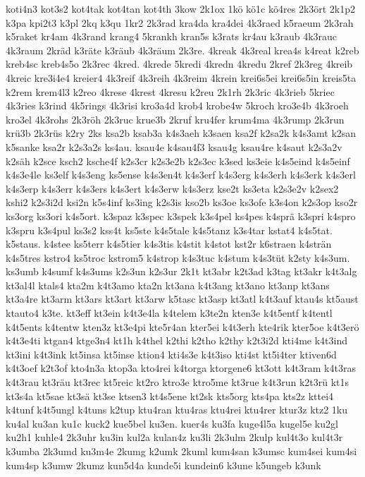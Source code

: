 {koti4n3
kot3s2
kot4tak
kot4tan
kot4th
3kow
2k1ox
1kö
kö1c
kö4res
2k3ört
2k1p2
k3pa
kpi2t3
k3pl
2kq
k3qu
1kr2
2k3rad
kra4da
kra4dei
4k3raed
k5raeum
2k3rah
k5raket
kr4am
4k3rand
krang4
5krankh
kran5s
k3rats
kr4au
k3raub
4k3rauc
4k3raum
2kräd
k3räte
k3räub
4k3räum
2k3re.
4kreak
4k3real
krea4s
k4reat
k2reb
kreb4sc
kreb4s5o
2k3rec
4kred.
4krede
5kredi
4kredn
4kredu
2kref
2k3reg
4kreib
4kreic
kre3i4e4
kreier4
4k3reif
4k3reih
4k3reim
4krein
krei6s5ei
krei6s5in
kreis5ta
k2rem
krem4l3
k2reo
4krese
4krest
4kresu
k2reu
2k1rh
2k3ric
4k3rieb
5kriec
4k3ries
k3rind
4k5rings
4k3risi
kro3a4d
krob4
krobe4w
5kroch
kro3e4b
4k3roeh
kro3el
4k3rohs
2k3röh
2k3ruc
krue3b
2kruf
kru4fer
krum4ma
4k3rump
2k3run
krü3b
2k3rüs
k2ry
2ks
ksa2b
ksab3a
k4s3aeh
k3saen
ksa2f
k2sa2k
k4s3amt
k2san
k5sanke
ksa2r
k2s3a2s
ks4au.
ksau4e
k4sau4f3
ksau4g
ksau4re
k4saut
k2s3a2v
k2säh
k2sce
ksch2
ksche4f
k2s3cr
k2s3e2b
k2s3ec
k3sed
ks3eie
k4s5eind
k4s5einf
k4s3e4le
ks3elf
k4s3eng
ks5ense
k4s3en4t
k4s3erf
k4s3erg
k4s3erh
k4s3erk
k4s3erl
k4s3erp
k4s3err
k4s3ers
k4s3ert
k4s3erw
k4s3erz
kse2t
ks3eta
k2s3e2v
k2sex2
kshi2
k2s3i2d
ksi2n
k5s4inf
ks3ing
k2s3is
kso2b
ks3oe
ks3ofe
k3s4on
k2s3op
kso2r
ks3org
ks3ori
k4s5ort.
k3spaz
k3spec
k3spek
k3s4pel
ks4pes
k4sprä
k3spri
k4spro
k3spru
k3s4pul
ks3s2
kss4t
ks5ste
k4s5tale
k4s5tanz
k3s4tar
kstat4
k4s5tat.
k5staus.
k4stee
ks5terr
k4s5tier
k4s3tis
k4stit
k4stot
kst2r
k6straen
k4strän
k4s5tres
kstro4
ks5troc
kstrom5
k4strop
k4s3tuc
k4stum
k4s3tüt
k2sty
k4s3um.
ks3umb
k4sumf
k4s3ums
k2s3un
k2s3ur
2k1t
kt3abr
k2t3ad
k3tag
kt3akr
k4t3alg
kt3al4l
ktals4
kta2m
k4t3amo
kta2n
kt3ana
k4t3ang
kt3ano
kt3anp
kt3ans
kt3a4re
kt3arm
kt3ars
kt3art
kt3arw
k5tasc
kt3asp
kt3atl
k4t3auf
ktau4s
kt5aust
ktauto4
k3te.
kt3eff
kt3ein
k4t3e4la
k4telem
k3te2n
kten3e
k4t5entf
k4tentl
k4t5ents
k4tentw
kten3z
kt3e4pi
kte5r4an
kter5ei
k4t3erh
kte4rik
kter5oe
k4t3erö
k4t3e4ti
ktgan4
ktge3n4
kt1h
k4thel
k2thi
k2tho
k2thy
k2t3i2d
kti4me
k4t3ind
kt3ini
k4t3ink
kt5insa
kt5inse
ktion4
kti4s3e
k4t3iso
kti4st
kt5i4ter
ktiven6d
k4t3oef
k2t3of
kto4n3a
ktop3a
kto4rei
k4torga
ktorgene6
kt3ott
k4t3ram
k4t3ras
k4t3rau
kt3räu
kt3rec
kt5reic
kt2ro
ktro3e
ktro5me
kt3rue
k4t3run
k2t3rü
kt1s
kt3s4a
kt5sae
kt3sä
kt3se
ktsen3
kt4s5ene
kt2sk
kts5org
kts4pa
kts2z
kttei4
k4tunf
k4t5ungl
k4tuns
k2tup
ktu4ran
ktu4ras
ktu4rei
ktu4rer
ktur3z
ktz2
1ku
ku4al
ku3an
ku1c
kuck2
kue5bel
ku3en.
kuer4s
ku3fa
kuge4l5a
kugel5e
ku2gl
ku2h1
kuhle4
2k3uhr
ku3in
kul2a
kulan4z
ku3li
2k3ulm
2kulp
kul4t3o
kul4t3r
k3umba
2k3umd
ku3m4e
2kumg
k2umk
2kuml
kum4san
k3umsc
kum4sei
kum4si
kum4sp
k3umw
2kumz
kun5d4a
kunde5i
kundein6
k3une
k5ungeb
k3unk
}
